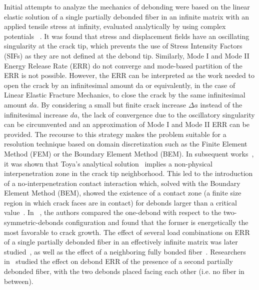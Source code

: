Initial attempts to analyze the mechanics of debonding were based on the linear elastic solution of a single partially debonded fiber in an infinite matrix with an applied tensile stress at infinity, evaluated analytically by using complex potentials ~\cite{England1966,Perlman1967,Toya1974}. It was found that stress and displacement fields have an oscillating singularity at the crack tip, which prevents the use of Stress Intensity Factors (SIFs) as they are not defined at the debond tip. Similarly, Mode I and Mode II Energy Release Rate (ERR) do not converge and mode-based partition of the ERR is not possible. However, the ERR can be interpreted as the work needed to open the crack by an infinitesimal amount da or equivalently, in the case of Linear Elastic Fracture Mechanics, to close the crack by the same infinitesimal amount $da$. By considering a small but finite crack increase $\Delta a$ instead of the infinitesimal increase $da$, the lack of convergence due to the oscillatory singularity can be circumvented and an approximation of Mode I and Mode II ERR can be provided. The recourse to this strategy makes the problem suitable for a resolution technique based on domain discretization such as the Finite Element Method (FEM) or the Boundary Element Method (BEM). In subsequent works~\cite{Paris1996,Varna1997a}, it was shown that Toya's analytical solution~\cite{Toya1974} implies a non-physical interpenetration zone in the crack tip neighborhood. This led to the introduction of a no-interpenetration contact interaction which, solved with the Boundary Element Method (BEM), showed the existence of a contact zone (a finite size region in which crack faces are in contact) for debonds larger than a critical value~\cite{Varna1997a}. In ~\cite{Garcia2015}, the authors compared the one-debond with respect to the two-symmetric-debonds configuration and found that the former is energetically the most favorable to crack growth. The effect of several load combinations on ERR of a single partially debonded fiber in an effectively infinite matrix was later studied~\cite{Correa2007,Correa2013,Correa2014}, as well as the effect of a neighboring fully bonded fiber~\cite{Sandino2016,Zhuang2018}. Researchers in~\cite{Varna2017} studied the effect on debond ERR of the presence of a second partially debonded fiber, with the two debonds placed facing each other (i.e. no fiber in between).\\
